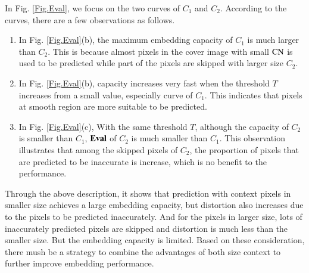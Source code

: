\documentclass[review,3p,10pt,sort&compress]{elsarticle}
\begin{document}
In Fig. \ref{Fig.Eval}, we focus on the two curves of $C_1$ and $C_2$. According to the curves, there are a few observations as follows.
\begin{enumerate}
  \item In Fig. \ref{Fig.Eval}(b), the maximum embedding capacity of $C_1$ is much larger than $C_2$. This is because almost pixels in the cover image with small ${\rm CN}$ is used to be predicted while part of the pixels are skipped with larger size $C_2$.
  \item In Fig. \ref{Fig.Eval}(b), capacity increases very fast when the threshold $T$ increases from a small value, especially curve of $C_1$. This indicates that pixels at smooth region are more suitable to be predicted.
  \item In Fig. \ref{Fig.Eval}(c), With the same threshold $T$, although the capacity of $C_2$ is smaller than $C_1$, ${\rm \mathbf{Eval}}$ of $C_2$ is much smaller than $C_1$. This observation illustrates that among the skipped pixels of $C_2$, the proportion of pixels that are predicted to be inaccurate is increase, which is no benefit to the performance.
\end{enumerate}
Through the above description, it shows that prediction with context pixels in smaller size achieves a large embedding capacity, but distortion also increases due to the pixels to be predicted inaccurately. And for the pixels in larger size, lots of inaccurately predicted pixels are skipped and distortion is much less than the smaller size. But the embedding capacity is limited. Based on these consideration, there mush be a strategy to combine the advantages of both size context to further improve embedding performance.
\end{document}
